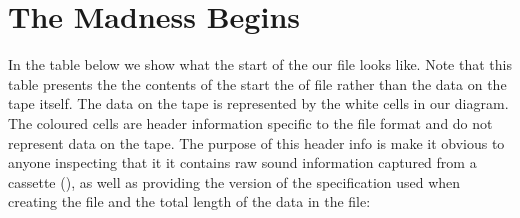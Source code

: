 \section{The Madness Begins}

In the table below we show what the start of the our  file looks like. Note that this table
presents the the contents of the
start the of  file rather than the data on the tape itself. The data on the tape is represented by the white
cells in our diagram. The coloured cells are header information specific to the  file format and do not represent
data on the tape. The purpose of this header info is make it obvious to anyone inspecting  that it
it contains raw sound information captured from a cassette (), as well as providing the version of the  specification
used when creating the file and the total length of the data in the file:


